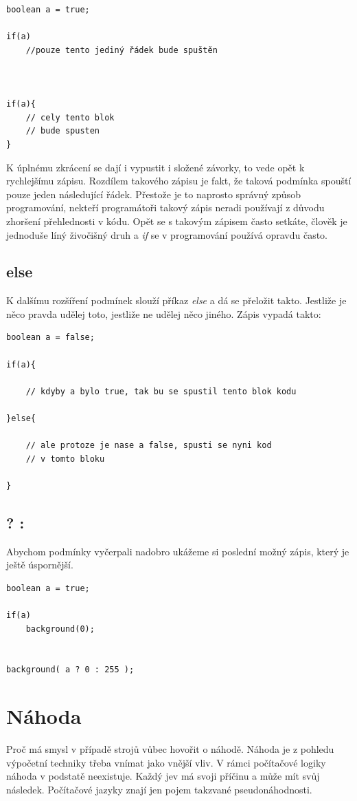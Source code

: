 \documentclass[11pt]{book}
\newcommand{\oddil}[1]{\section{#1}\label{sec:#1}}
\newcommand{\pododdil}[1]{\subsection{#1}\label{subsec:#1}}
\begin{document}
  
\begin{lstlisting}
boolean a = true;

if(a)
	//pouze tento jediný řádek bude spuštěn
	
	
	
if(a){
	// cely tento blok
	// bude spusten
}
\end{lstlisting}

K úplnému zkrácení se dají i vypustit i složené závorky, to vede opět k rychlejšímu zápisu. Rozdílem takového zápisu je fakt, že taková podmínka spouští pouze jeden následující řádek. Přestože je to naprosto správný způsob programování, nekteří programátoři takový zápis neradi používají z důvodu zhoršení přehlednosti v kódu. Opět se s takovým zápisem často setkáte, člověk je jednoduše líný živočišný druh a {\em if} se v programování používá opravdu často.

\pododdil{else}

K dalšímu rozšíření podmínek slouží příkaz {\em else} a dá se přeložit takto. Jestliže je něco pravda udělej toto, jestliže ne udělej něco jiného. Zápis vypadá takto:

\begin{lstlisting}
boolean a = false;

if(a){

	// kdyby a bylo true, tak bu se spustil tento blok kodu 

}else{

	// ale protoze je nase a false, spusti se nyni kod
	// v tomto bloku
	
}
\end{lstlisting}



\pododdil{ ? : }

Abychom podmínky vyčerpali nadobro ukážeme si poslední možný zápis, který je ještě úspornější.
  
  
\begin{lstlisting}
boolean a = true;

if(a)
	background(0);
	
	
background( a ? 0 : 255 );

\end{lstlisting}
      


\oddil{Náhoda}

Proč má smysl v případě strojů vůbec hovořit o náhodě. Náhoda je z pohledu výpočetní techniky třeba vnímat jako vnější vliv. V rámci počítačové logiky náhoda v podstatě neexistuje. Každý jev má svoji příčinu a může mít svůj následek. Počítačové jazyky znají jen pojem takzvané pseudonáhodnosti.
\end{document}
